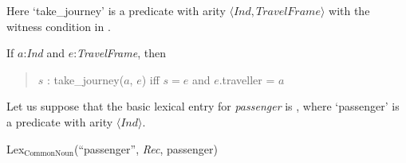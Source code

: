 Here `take\_journey' is a predicate with arity
$\langle\textit{Ind},\textit{TravelFrame}\rangle$ with the witness
condition 
in \nexteg{}.
\begin{ex} 
  If $a$:\textit{Ind} and $e$:\textit{TravelFrame}, then
  \begin{quote}
    $s$ : 
    take\_journey($a$, $e$) iff $s=e$ and $e$.traveller = $a$
  \end{quote}
  
\end{ex}

Let us suppose that the basic lexical entry for \textit{passenger} is
\nexteg{}, where `passenger' is a predicate with arity $\langle\textit{Ind}\rangle$.  %
\begin{ex} 
 Lex$_{\mathrm{CommonNoun}}$(``passenger'', \textit{Rec}, passenger) 
 
 
   
\end{ex} 
 
 
 
